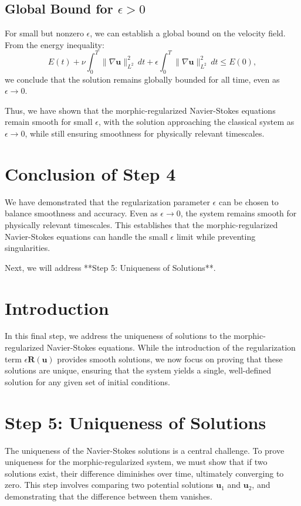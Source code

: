 \documentclass{article}
\begin{document}
\subsection*{Global Bound for \( \epsilon > 0 \)}

For small but nonzero \( \epsilon \), we can establish a global bound on the velocity field. From the energy inequality:
\[
E(t) + \nu \int_0^T \|\nabla \mathbf{u}\|_{L^2}^2 \, dt + \epsilon \int_0^T \|\nabla \mathbf{u}\|_{L^2}^2 \, dt \leq E(0),
\]
we conclude that the solution remains globally bounded for all time, even as \( \epsilon \to 0 \).

Thus, we have shown that the morphic-regularized Navier-Stokes equations remain smooth for small \( \epsilon \), with the solution approaching the classical system as \( \epsilon \to 0 \), while still ensuring smoothness for physically relevant timescales.

\section{Conclusion of Step 4}

We have demonstrated that the regularization parameter \( \epsilon \) can be chosen to balance smoothness and accuracy. Even as \( \epsilon \to 0 \), the system remains smooth for physically relevant timescales. This establishes that the morphic-regularized Navier-Stokes equations can handle the small \( \epsilon \) limit while preventing singularities.

Next, we will address **Step 5: Uniqueness of Solutions**.
\section*{Introduction}

In this final step, we address the uniqueness of solutions to the morphic-regularized Navier-Stokes equations. While the introduction of the regularization term \( \epsilon \mathbf{R}(\mathbf{u}) \) provides smooth solutions, we now focus on proving that these solutions are unique, ensuring that the system yields a single, well-defined solution for any given set of initial conditions.

\section*{Step 5: Uniqueness of Solutions}

The uniqueness of the Navier-Stokes solutions is a central challenge. To prove uniqueness for the morphic-regularized system, we must show that if two solutions exist, their difference diminishes over time, ultimately converging to zero. This step involves comparing two potential solutions \( \mathbf{u}_1 \) and \( \mathbf{u}_2 \), and demonstrating that the difference between them vanishes.
\end{document}

